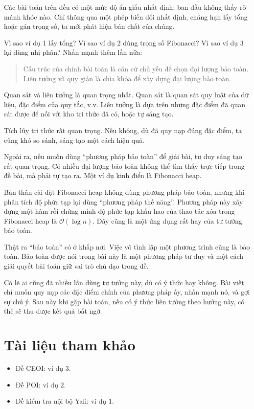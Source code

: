 \documentclass[11pt]{article}
\newcommand{\Oh}{\mathcal{O}}
\begin{document}
Các bài toán trên đều có một mức độ ẩn giấu nhất định; ban đầu không thấy rõ
mánh khóe nào. Chỉ thông qua một phép biến đổi nhất định, chẳng hạn lấy tổng
hoặc gán trọng số, ta mới phát hiện bản chất của chúng.

Vì sao ví dụ 1 lấy tổng? Vì sao ví dụ 2 dùng trọng số Fibonacci? Vì sao ví dụ
3 lại dùng nhị phân? Nhấn mạnh thêm lần nữa:
\begin{quote}
Cấu trúc của chính bài toán là căn cứ chủ yếu để chọn đại lượng bảo toàn.
Liên tưởng và quy giản là chìa khóa để xây dựng đại lượng bảo toàn.
\end{quote}

Quan sát và liên tưởng là quan trọng nhất. Quan sát là quan sát quy luật của
dữ liệu, đặc điểm của quy tắc, v.v. Liên tưởng là dựa trên những đặc điểm đã
quan sát được để nối với kho tri thức đã có, hoặc tự sáng tạo.

Tích lũy tri thức rất quan trọng. Nếu không, dù đã quy nạp đúng đặc điểm, ta
cũng khó so sánh, sáng tạo một cách hiệu quả.

Ngoài ra, nếu muốn dùng ``phương pháp bảo toàn'' để giải bài, tư duy sáng tạo
rất quan trọng. Có nhiều đại lượng bảo toàn không thể tìm thấy trực tiếp trong
đề bài, mà phải tự tạo ra. Một ví dụ kinh điển là Fibonacci heap.

Bản thân cài đặt Fibonacci heap không dùng phương pháp bảo toàn, nhưng khi
phân tích độ phức tạp lại dùng ``phương pháp thế năng''. Phương pháp này xây
dựng một hàm rồi chứng minh độ phức tạp khấu hao của thao tác xóa trong
Fibonacci heap là \(\Oh(\log n)\). Đây cũng là một ứng dụng rất hay của tư
tưởng bảo toàn.

Thật ra ``bảo toàn'' có ở khắp nơi. Việc vô tình lập một phương trình cũng là
bảo toàn. Bảo toàn được nói trong bài này là một phương pháp tư duy và một
cách giải quyết bài toán giữ vai trò chủ đạo trong đề.

Có lẽ ai cũng đã nhiều lần dùng tư tưởng này, dù có ý thức hay không. Bài
viết chỉ muốn quy nạp các đặc điểm chính của phương pháp ấy, nhấn mạnh nó, và
gợi sự chú ý. Sau này khi gặp bài toán, nếu có ý thức liên tưởng theo hướng
này, có thể sẽ thu được kết quả bất ngờ.

\section*{Tài liệu tham khảo}

\begin{itemize}
  \item Đề CEOI: ví dụ 3.
  \item Đề POI: ví dụ 2.
  \item Đề kiểm tra nội bộ Yali: ví dụ 1.
\end{itemize}
\end{document}
